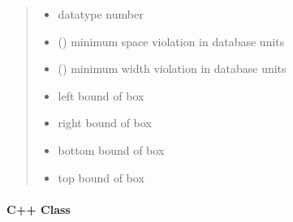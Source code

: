 \documentclass[a4paper,10pt,english]{sphinxmanual}
\begin{document}
\begin{fulllineitems}
\begin{fulllineitems}
\begin{quote}
\begin{description}
\begin{itemize}
\item {} 
 \textendash{} datatype number

\item {} 
 () \textendash{} minimum space violation in database units

\item {} 
 () \textendash{} minimum width violation in database units

\item {} 
 \textendash{} left bound of box

\item {} 
 \textendash{} right bound of box

\item {} 
 \textendash{} bottom bound of box

\item {} 
 \textendash{} top bound of box

\end{itemize}

\end{description}\end{quote}

\end{fulllineitems}


\end{fulllineitems}



\paragraph{C++ Class}
\label{\detokenize{drc/drc:c-class}}
\end{document}
